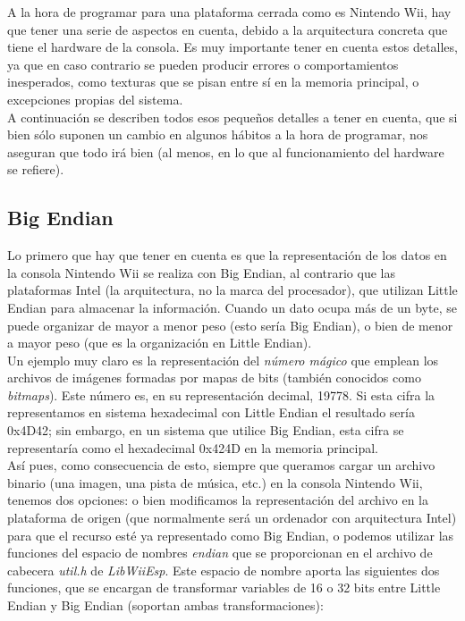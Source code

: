 
A la hora de programar para una plataforma cerrada como es Nintendo Wii, hay que tener una serie de aspectos en cuenta, debido a la arquitectura concreta que tiene el hardware de la consola. Es muy importante tener en cuenta estos detalles, ya que en caso contrario se pueden producir errores o comportamientos inesperados, como texturas que se pisan entre sí en la memoria principal, o excepciones propias del sistema. \\

A continuación se describen todos esos pequeños detalles a tener en cuenta, que si bien sólo suponen un cambio en algunos hábitos a la hora de programar, nos aseguran que todo irá bien (al menos, en lo que al funcionamiento del hardware se refiere).

\subsection{Big Endian}

Lo primero que hay que tener en cuenta es que la representación de los datos en la consola Nintendo Wii se realiza con Big Endian, al contrario que las plataformas Intel (la arquitectura, no la marca del procesador), que utilizan Little Endian para almacenar la información. Cuando un dato ocupa más de un byte, se puede organizar de mayor a menor peso (esto sería Big Endian), o bien de menor a mayor peso (que es la organización en Little Endian). \\

Un ejemplo muy claro es la representación del \emph{número mágico} que emplean los archivos de imágenes formadas por mapas de bits (también conocidos como \emph{bitmaps}). Este número es, en su representación decimal, 19778. Si esta cifra la representamos en sistema hexadecimal con Little Endian el resultado sería 0x4D42; sin embargo, en un sistema que utilice Big Endian, esta cifra se representaría como el hexadecimal 0x424D en la memoria principal. \\

Así pues, como consecuencia de esto, siempre que queramos cargar un archivo binario (una imagen, una pista de música, etc.) en la consola Nintendo Wii, tenemos dos opciones: o bien modificamos la representación del archivo en la plataforma de origen (que normalmente será un ordenador con arquitectura Intel) para que el recurso esté ya representado como Big Endian, o podemos utilizar las funciones del espacio de nombres \emph{endian} que se proporcionan en el archivo de cabecera \emph{util.h} de \emph{LibWiiEsp}. Este espacio de nombre aporta las siguientes dos funciones, que se encargan de transformar variables de 16 o 32 bits entre Little Endian y Big Endian (soportan ambas transformaciones):

